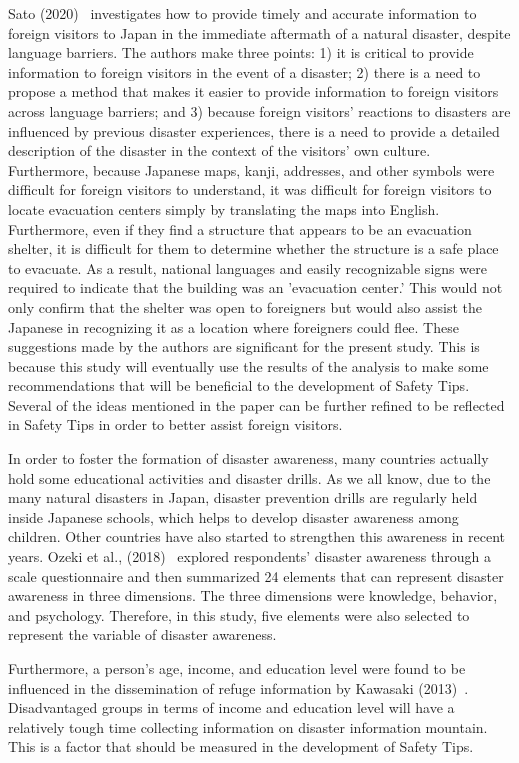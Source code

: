  Sato (2020)~\cite{ref8}  investigates how to provide timely and accurate information to foreign visitors to Japan in the immediate aftermath of a natural disaster, despite language barriers. The authors make three points: 1) it is critical to provide information to foreign visitors in the event of a disaster; 2) there is a need to propose a method that makes it easier to provide information to foreign visitors across language barriers; and 3) because foreign visitors' reactions to disasters are influenced by previous disaster experiences, there is a need to provide a detailed description of the disaster in the context of the visitors' own culture. Furthermore, because Japanese maps, kanji, addresses, and other symbols were difficult for foreign visitors to understand, it was difficult for foreign visitors to locate evacuation centers simply by translating the maps into English. Furthermore, even if they find a structure that appears to be an evacuation shelter, it is difficult for them to determine whether the structure is a safe place to evacuate. As a result, national languages and easily recognizable signs were required to indicate that the building was an 'evacuation center.' This would not only confirm that the shelter was open to foreigners but would also assist the Japanese in recognizing it as a location where foreigners could flee. These suggestions made by the authors are significant for the present study. This is because this study will eventually use the results of the analysis to make some recommendations that will be beneficial to the development of Safety Tips. Several of the ideas mentioned in the paper can be further refined to be reflected in Safety Tips in order to better assist foreign visitors.

In order to foster the formation of disaster awareness, many countries actually hold some educational activities and disaster drills. As we all know, due to the many natural disasters in Japan, disaster prevention drills are regularly held inside Japanese schools, which helps to develop disaster awareness among children. Other countries have also started to strengthen this awareness in recent years. Ozeki et al., (2018)~\cite{ref45} explored respondents' disaster awareness through a scale questionnaire and then summarized 24 elements that can represent disaster awareness in three dimensions. The three dimensions were knowledge, behavior, and psychology. Therefore, in this study, five elements were also selected to represent the variable of disaster awareness.

Furthermore, a person's age, income, and education level were found to be influenced in the dissemination of refuge information by Kawasaki (2013)~\cite{ref53}. Disadvantaged groups in terms of income and education level will have a relatively tough time collecting information on disaster information mountain. This is a factor that should be measured in the development of Safety Tips.